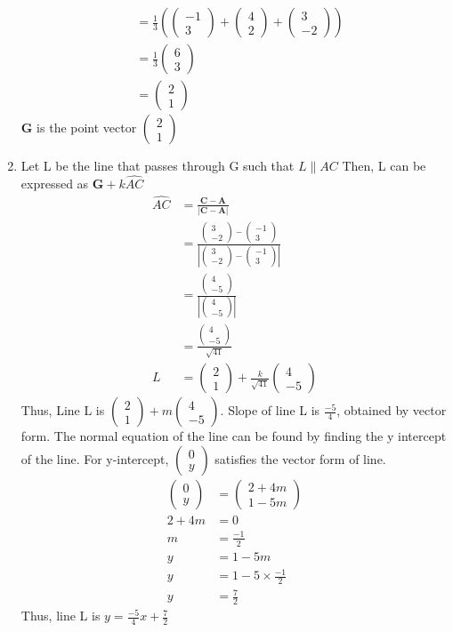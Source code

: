 \documentclass[journal,12pt,twocolumn]{IEEEtran}
\let\vec\mathbf
\providecommand{\abs}[1]{\left\vert#1\right\vert}
\newcommand{\myvec}[1]{\ensuremath{\begin{pmatrix}#1\end{pmatrix}}}
\begin{document}
\begin{enumerate}
\begin{align}
        \\
        &= \frac{1}{3}(\myvec{-1 \\ 3} + \myvec{4 \\ 2} + \myvec{3 \\ -2})
        \\
        &=\frac{1}{3}\myvec{6 \\ 3}
        \\
        &= \myvec{2 \\ 1}
    \end{align}
    $\vec{G}$ is the point vector $\myvec{2 \\ 1}$
\item Let L be the line that passes through G such that $L \parallel AC$
    Then, L can be expressed as $\vec{G} + k\hat{AC}$
    \begin{align}
        \hat{AC} &= \frac{\vec{C} - \vec{A}}{\abs{\vec{C} - \vec{A}}}
		\\        
        &= \frac{\myvec{3 \\ -2} - \myvec{-1 \\ 3}}{\abs{\myvec{3 \\ -2} - \myvec{-1 \\ 3}}}
        \\
        &= \frac{\myvec{4 \\ -5}}{\abs{\myvec{4 \\ -5}}}
		\\        
        &= \frac{\myvec{4 \\ -5}}{\sqrt{41}}
        \\
        L &= \myvec{2 \\ 1} + \frac{k}{\sqrt{41}}\myvec{4 \\ -5}
    \end{align}
    Thus, Line L is $\myvec{2 \\ 1} + m\myvec{4 \\ -5}$.
    Slope of line L is $\frac{-5}{4}$, obtained by vector form.
    The normal equation of the line can be found by finding the y intercept of the line.
    For y-intercept, $\myvec{0 \\ y}$ satisfies the vector form of line.
    \begin{align}
    		\myvec{0 \\ y} &= \myvec{2 + 4m \\ 1 - 5m}
    		\\
    		2+4m &= 0
    		\\
    		m &= \frac{-1}{2} 
    		\\
    		y &= 1 - 5m
    		\\
    		y &= 1 - 5 \times \frac{-1}{2}
    		\\
    		y &= \frac{7}{2}
    \end{align}
    Thus, line L is $y = \frac{-5}{4}x + \frac{7}{2}$
\end{enumerate}
\end{document}
